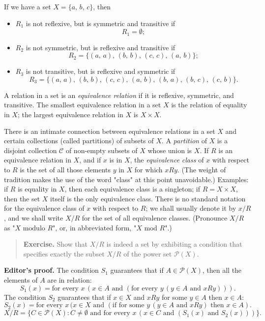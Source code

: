 If we have a set $X = \{ a, \, b, \, c\}$, then
\begin{itemize}
	\item $R_1$ is not reflexive, but is symmetric and transitive if
	\[
		R_1 = \emptyset;
	\]
	\item $R_2$ is not symmetric, but is reflexive and transitive if
	\[
		R_2 = \{ (a, \, a), \, (b, \, b), \, (c, \, c), \, (a, \, b)\};
	\]
	\item $R_3$ is not transitive, but is reflexive and symmetric if
	\[
		R_3 = \{ (a, \, a), \, (b, \, b), \, (c, \, c), \, (a, \, b), \, (b, \, a), \, (b, \, c), \, (c, \, b)\}.
	\]
\end{itemize}

A relation in a set is an \textit{equivalence relation} if it is reflexive, symmetric, and transitive. The smallest equivalence relation in a set $X$ is the relation of equality in $X$; the largest equivalence relation in $X$ is $X \times X$.

There is an intimate connection between equivalence relations in a set $X$ and certain collections (called partitions) of subsets of $X$. A \textit{partition} of $X$ is a disjoint collection $\mathcal{C}$ of non-empty subsets of $X$ whose union is $X$. If $R$ is an equivalence relation in $X$, and if $x$ is in $X$, the \textit{equivalence class} of $x$ with respect to $R$ is the set of all those elements $y$ in $X$ for which $xRy$. (The weight of tradition makes the use of the word "class" at this point unavoidable.) Examples: if $R$ is equality in $X$, then each equivalence class is a singleton; if $R = X \times X$, then the set $X$ itself is the only equivalence class. There is no standard notation for the equivalence class of $x$ with respect to $R$; we shall usually denote it by $x / R$, and we shall write $X / R$ for the set of all equivalence classes. (Pronounce $X / R$ as "$X \text{ modulo } R$", or, in abbreviated form, "$X \text{ mod } R$".)

\begin{quote}
	\textbf{Exercise.} Show that $X / R$ is indeed a set by exhibiting a condition that specifies exactly the subset $X / R$ of the power set $\mathcal{P}(X)$.
\end{quote}

\textbf{Editor's proof.} The condition $S_1$ guarantees that if $A \in \mathcal{P}(X)$, then all the elements of $A$ are in relation:
\[
	S_1(x) = \text{for every } x \, (x \in A \text{ and } (\text{for every } y \, (y \in A \text{ and } xRy))).
\]
The condition $S_2$ guarantees that if $x \in X$ and $xRy$ for some $y \in A$ then $x \in A$:
\[
	S_2(x) = \text{for every } x \, (x \in X \text{ and } (\text{if for some }  y \, (y \in A \text{ and } xRy) \text{ then } x \in A).
\]
\[
	X / R = \{C \in \mathcal{P}(X) : C \neq \emptyset \text{ and for every } x \, (x \in C \text{ and } (S_1(x) \text{ and } S_2(x)))\}.
\]

